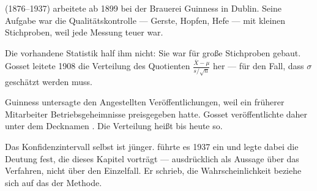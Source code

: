 \begin{aufgabe}
\begin{center}
\begin{minipage}{0.86\textwidth}
\end{minipage}
\end{center}
\end{aufgabe}

\begin{geschichte}
 (1876--1937) arbeitete ab 1899 bei der Brauerei Guinness in Dublin. Seine Aufgabe war die Qualitätskontrolle --- Gerste, Hopfen, Hefe --- mit kleinen Stichproben, weil jede Messung teuer war.

Die vorhandene Statistik half ihm nicht: Sie war für große Stichproben gebaut. Gosset leitete 1908 die Verteilung des Quotienten $\frac{\overline X - \mu}{s/\sqrt n}$ her --- für den Fall, dass $\sigma$ geschätzt werden muss.

Guinness untersagte den Angestellten Veröffentlichungen, weil ein früherer Mitarbeiter Betriebsgeheimnisse preisgegeben hatte. Gosset veröffentlichte daher unter dem Decknamen . Die Verteilung heißt bis heute so.

\begin{center}
\begin{minipage}{0.9\textwidth}
\end{minipage}
\end{center}

Das Konfidenzintervall selbst ist jünger.  führte es 1937 ein und legte dabei die Deutung fest, die dieses Kapitel vorträgt --- ausdrücklich als Aussage über das Verfahren, nicht über den Einzelfall. Er schrieb, die Wahrscheinlichkeit beziehe sich auf das  der Methode.

\begin{center}
\begin{minipage}{0.9\textwidth}
\end{minipage}
\end{center}
\end{geschichte}

